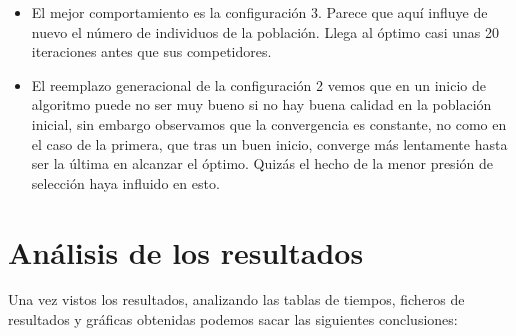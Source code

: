 \documentclass[runningheads]{llncs}
\begin{document}
\begin{itemize}
 \item El mejor comportamiento es la configuración 3. Parece que aquí influye de nuevo el número de individuos de la población. 
 Llega al óptimo casi unas 20 iteraciones antes que sus competidores.
 \item El reemplazo generacional de la configuración 2 vemos que en un inicio de algoritmo puede no ser muy bueno si no hay buena 
 calidad en la población inicial, sin embargo observamos que la convergencia es constante, no como en el caso de la primera, que 
 tras un buen inicio, converge más lentamente hasta ser la última en alcanzar el óptimo. Quizás el hecho de la menor presión 
 de selección haya influido en esto.
\end{itemize}






\section{Análisis de los resultados}
\label{sec:analisis}
Una vez vistos los resultados, analizando las tablas de tiempos, ficheros de resultados y gráficas obtenidas 
podemos sacar las siguientes conclusiones:
\end{document}
